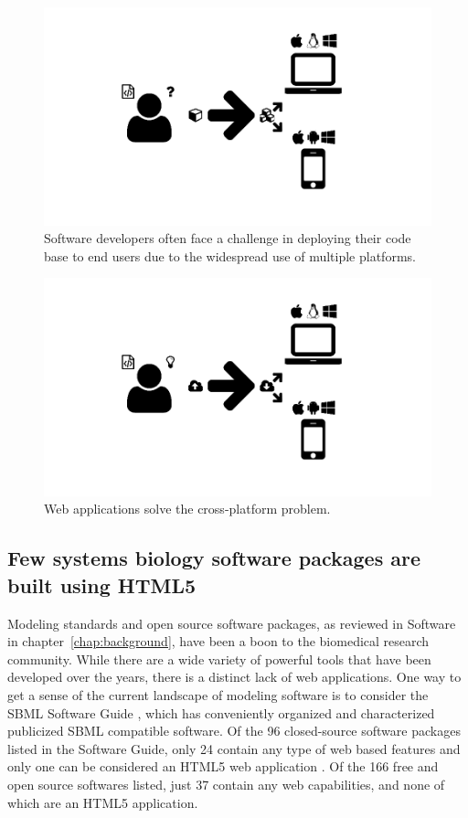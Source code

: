 \begin{figure}
  \centering
  \includegraphics[width=\textwidth,natwidth=610,natheight=642]{images/deployment-problem.png}
  \caption{Software developers often face a challenge in deploying their code base to end users due to the widespread use of multiple platforms.}
  \label{fig:deployment-problem}
\end{figure}
\begin{figure}
  \centering
  \includegraphics[width=\textwidth,natwidth=610,natheight=642]{images/web-app-deployment.png}
  \caption{Web applications solve the cross-platform problem.}
  \label{fig:web-app-deployment}
\end{figure}

\subsection{Few systems biology software packages are built using HTML5}
Modeling standards and open source software packages, as reviewed in  Software in chapter~\ref{chap:background}, have been a boon to the biomedical research community.
While there are a wide variety of powerful tools that have been developed over the years, there is a distinct lack of web applications.
One way to get a sense of the current landscape of modeling software is to consider the SBML Software Guide \autocite{sbml2014software}, which has conveniently organized and characterized publicized SBML compatible software.
Of the 96 closed-source software packages listed in the Software Guide, only 24 contain any type of web based features and only one can be considered an HTML5 web application \autocite{olivier2004web}.
Of the 166 free and open source softwares listed, just 37 contain any web capabilities, and none of which are an HTML5 application.
